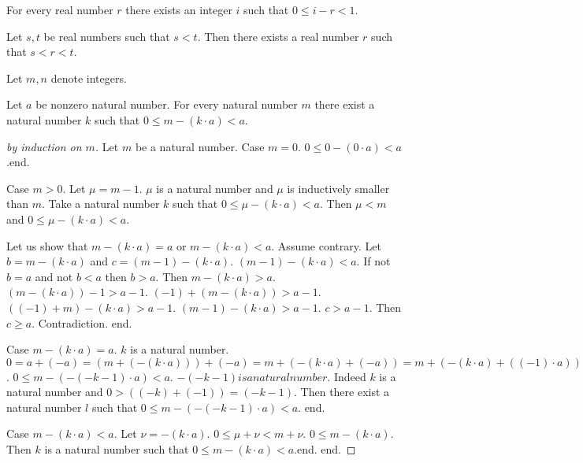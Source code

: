 \documentclass{article}
\begin{document}
\begin{forthel}
\begin{axiom}%
For every real number $r$ there exists an integer $i$ such that $0 \leq i-r < 1$.
\end{axiom}

\begin{axiom}
Let $s,t$ be real numbers such that $s < t$.
Then there exists a real number $r$ such that $s < r < t$.
\end{axiom}




Let $m,n$ denote integers.


\begin{proposition}
Let $a$ be nonzero natural number.
For every natural number $m$ there exist
a natural number $k$ such that $0 \leq m - (k \cdot a) < a$.
\end{proposition}
\begin{proof}[by induction on $m$]
Let $m$ be a natural number.
Case $m = 0$.
$0 \leq 0 - (0 \cdot a) < a$.end.

Case $m > 0$. Let $\mu = m-1$.
$\mu$ is a natural number and $\mu$ is inductively smaller than $m$.
Take a natural number $k$ such that $0 \leq \mu - (k \cdot a) < a$.
Then $\mu < m$ and $0 \leq \mu - (k \cdot a) <  a$.

Let us show that $m - (k \cdot a) = a$ or $m - (k \cdot a) < a$.
Assume contrary.
Let $b = m - (k \cdot a)$ and $c = (m-1) - (k \cdot a)$.
$(m-1) - (k \cdot a) < a$.
If not $b = a$ and not $b < a$ then $b > a$.
Then $m - (k \cdot a) > a$.
$(m - (k \cdot a)) - 1 > a - 1$.
$(-1) + (m - (k\cdot a)) > a - 1$.
$((-1) + m) - (k \cdot a) > a - 1$.
$(m-1) - (k \cdot a) > a - 1$.
$c > a-1$.
Then $c \geq a$.
Contradiction.
end.

Case $m - (k \cdot a) = a$. 
$k$ is a natural number.
$0 = 
a + (-a) = 
(m + (-(k \cdot a))) + (-a) =
m + (-(k \cdot a) + (-a)) = 
m + (-(k \cdot a) + ((-1) \cdot a)) = 
m + (((-k) \cdot a) + ((-1) \cdot a)) =
m + (((-k)+(-1)) \cdot a) = 
m + ((-k-1) \cdot a) =
m - (-(-k-1) \cdot a)$. 
$0 \leq m - (-(-k-1) \cdot a) < a$. 
$-(-k-1) is a natural number$. 
Indeed $k$ is a natural number and $0 > ((-k) + (-1)) = (-k-1)$.
Then there exist a natural number $l$ such that
$0 \leq m - (-(-k-1) \cdot a) < a$.
end.

Case $m - (k \cdot a) < a$. Let $\nu = -(k \cdot a)$.
$0 \leq \mu + \nu < m + \nu$. 
$0 \leq m - (k \cdot a)$.
Then $k$ is a natural number such that
$0 \leq  m - (k \cdot a) < a$.end.
end. 
\end{proof}


\end{forthel}
\end{document}
